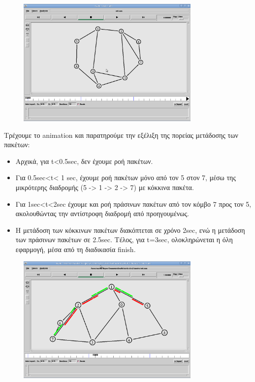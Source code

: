 \documentclass[a4paper,9pt]{article}
\begin{document}
\def\thesection {\Roman{section}.}



\section{}

\begin{figure}[h]
    \centering
    \includegraphics[width=0.8\textwidth]{files/1.png}
\end{figure}

Τρέχουμε το animation και παρατηρούμε την εξέλιξη της πορείας μετάδοσης των
πακέτων:

\begin{itemize}
    \item Αρχικά, για t<0.5sec, δεν έχουμε ροή πακέτων.
    \item Για 0.5sec<t< 1 sec, έχουμε ροή πακέτων μόνο από τον 5 στον 7, μέσω
        της μικρότερης διαδρομής (5 -> 1 -> 2 -> 7) με κόκκινα πακέτα.
    \item Για 1sec<t<2sec έχουμε και ροή πράσινων πακέτων από τον κόμβο 7 προς τον
        5, ακολουθώντας την αντίστροφη διαδρομή από προηγουμένως.
    \item Η μετάδοση των κόκκινων πακέτων διακόπτεται σε χρόνο 2sec, ενώ η
        μετάδοση των πράσινων πακέτων σε 2.5sec. Τέλος, για t=3sec, ολοκληρώνεται η
        όλη εφαρμογή, μέσα από τη διαδικασία finish.
\end{itemize}

\begin{figure}[h]
    \centering
    \includegraphics[width=0.8\textwidth]{files/2.png}
\end{figure}
\end{document}
